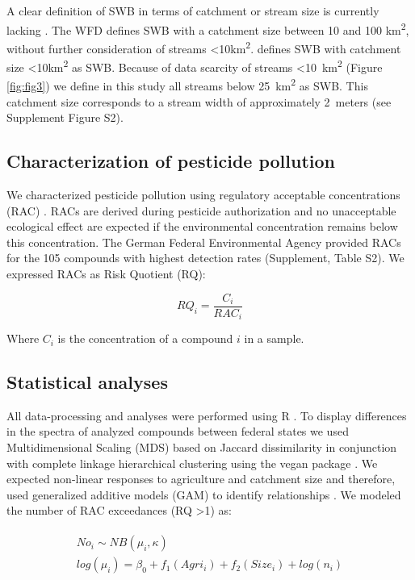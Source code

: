 \documentclass[journal=esthag,manuscript=article]{achemso}
\begin{document}
A clear definition of SWB in terms of catchment or stream size is currently lacking \citep{lorenz_specifics_2016}. 
The WFD defines SWB with a catchment size between 10 and 100 km\textsuperscript{2}, without further consideration of streams \textless 10km\textsuperscript{2}. 
\citet{lorenz_specifics_2016} defines SWB with catchment size \textless 10km\textsuperscript{2} as SWB.
Because of data scarcity of streams \textless 10~km\textsuperscript{2} (Figure \ref{fig:fig3}) we define in this study all streams below 25~km\textsuperscript{2} as SWB. This catchment size corresponds to a stream width of approximately 2~meters (see Supplement Figure S2).



\subsection{Characterization of pesticide pollution}
We characterized pesticide pollution using regulatory acceptable concentrations (RAC) \citep{brock_linking_2010}.
RACs are derived during pesticide authorization and no unacceptable ecological effect are expected if the environmental concentration remains below this concentration.
The German Federal Environmental Agency provided RACs for the 105 compounds with highest detection rates (Supplement, Table S2). 
We expressed RACs as Risk Quotient (RQ):

\begin{equation}
RQ_i = \frac{C_i}{RAC_i}
\end{equation}

Where $C_i$ is the concentration of a compound $i$ in a sample.


\subsection{Statistical analyses}
All data-processing and analyses were performed using R \citep{r_core_team_r:_2016}.
To display differences in the spectra of analyzed compounds between federal states we used Multidimensional Scaling (MDS) based on Jaccard dissimilarity in conjunction with complete linkage hierarchical clustering using the vegan package \citep{oksanen_vegan:_2016}.
We expected non-linear responses to agriculture and catchment size and therefore, used generalized additive models (GAM) to identify relationships \citep{fewster_analysis_2000}.
We modeled the number of RAC exceedances (RQ \textgreater 1) as:

\begin{align}
\begin{split}
  No_i \sim NB(\mu_i, \kappa) \\
  log(\mu_i)= \beta_0 + f_1(Agri_i) + f_2(Size_i) + log(n_i) \\
\end{split}
\end{align}
\end{document}

